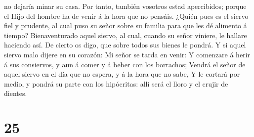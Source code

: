 no dejaría minar su casa.  Por tanto, también vosotros
estad apercibidos; porque el Hijo del hombre ha de venir á la hora que
no pensáis.  ¿Quién pues es el siervo fiel y prudente, al
cual puso su señor sobre su familia para que les dé alimento á tiempo?
 Bienaventurado aquel siervo, al cual, cuando su señor
viniere, le hallare haciendo así.  De cierto os digo, que
sobre todos sus bienes le pondrá.  Y si aquel siervo malo
dijere en su corazón: Mi señor se tarda en venir:  Y
comenzare á herir á sus consiervos, y aun á comer y á beber con los
borrachos;  Vendrá el señor de aquel siervo en el día que
no espera, y á la hora que no sabe,  Y le cortará por
medio, y pondrá su parte con los hipócritas: allí será el lloro y el
crujir de dientes.

\hypertarget{section-24}{%
\section{25}\label{section-24}}

